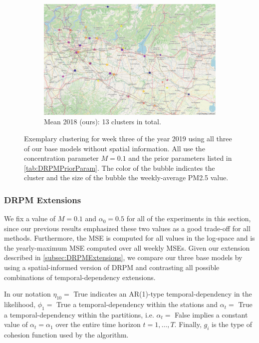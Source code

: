 \documentclass[12pt,a4paper]{article}
\begin{document}
\begin{figure}
\begin{subfigure}[b]{0.49\textwidth}
         \includegraphics[width=\textwidth]{./imgs/drpm/drpm_base_clustering_mean_prev_year.png}
         \caption{Mean 2018 (ours): 13 clusters in total.}
         \label{fig:DRPMMeanPreviousYear}
     \end{subfigure}
        \caption{Exemplary clustering for week three of the year 2019 using all three of
        our base models without spatial information. All use the concentration parameter
        $M=0.1$ and the prior parameters listed in \cref{tab:DRPMPriorParam}. The color of
        the bubble indicates the cluster and the size of the bubble the weekly-average PM2.5 value.}
        \label{fig:DRPMClusteringBaseModels}
\end{figure}

\subsubsection{DRPM Extensions}
We fix a value of $M= 0.1$ and $\alpha_0 = 0.5$ for all of the experiments in this section, since our previous results emphasized
these two values as a good trade-off for all methods. Furthermore, the MSE is computed for all values in the log-space and is the
yearly-maximum MSE computed over all weekly MSEs. Given our
extension described in \cref{subsec:DRPMExtensions}, we compare our three base models by using a spatial-informed version of
DRPM and contrasting all possible combinations of temporal-dependency extensions.

In our notation $\eta_{10} =$ True indicates an AR(1)-type temporal-dependency in the likelihood,
$\phi_1 =$ True a temporal-dependency within the stations and $\alpha_t = $ True a temporal-dependency within
the partitions, i.e. $\alpha_t = $ False implies a constant value of $\alpha_t = \alpha_1$ over the entire time horizon
$t = 1, \ldots, T$. Finally, $g_i$ is the type of cohesion function used by the algorithm.
\end{document}
